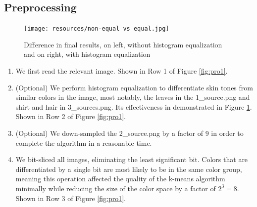 \documentclass[conference]{IEEEtran}
\begin{document}
\subsection{Preprocessing}
\begin{figure}[h]
    \centering
    \texttt{[image: resources/non-equal vs equal.jpg]}
    \caption{Difference in final results, on left, without histogram equalization and on right, with histogram equalization}
    \label{fig:equal}
\end{figure}
\begin{enumerate}
	\item \label{step:A1} We first read the relevant image. Shown in Row 1 of Figure \ref{fig:pro1}.
	\item \label{step:A2} (Optional) We perform histogram equalization to differentiate skin tones from similar colors in the image, most notably, the leaves in the 1\_source.png and shirt and hair in 3\_sources.png. Its effectiveness in demonstrated in Figure \ref{fig:equal}. Shown in Row 2 of Figure \ref{fig:pro1}.
	\item \label{step:A3} (Optional) We down-sampled the 2\_source.png by a factor of 9 in order to complete the algorithm in a reasonable time. 
	\item \label{step:A4} We bit-sliced all images, eliminating the least significant bit. Colors that are differentiated by a single bit are most likely to be in the same color group, meaning this operation affected the quality of the k-means algorithm minimally while reducing the size of the color space by a factor of $2^3=8$. Shown in Row 3 of Figure \ref{fig:pro1}.
\end{enumerate}
\end{document}
